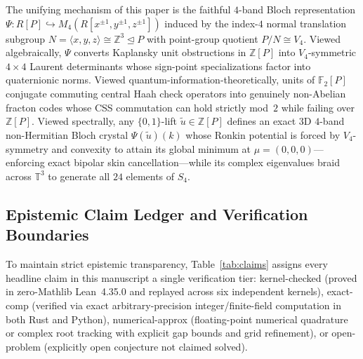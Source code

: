 \documentclass[11pt,reqno]{amsart}
\theoremstyle{definition}
\newcommand{\Z}{\mathbb{Z}}
\newcommand{\F}{\mathbb{F}}
\newcommand{\T}{\mathbb{T}}
\newcommand{\tierK}{\textsf{\scriptsize\textcolor{accentgreen}{kernel-checked}}}
\newcommand{\tierE}{\textsf{\scriptsize\textcolor{accentblue}{exact-comp}}}
\newcommand{\tierN}{\textsf{\scriptsize\textcolor{accentorange}{numerical-approx}}}
\newcommand{\tierO}{\textsf{\scriptsize\textcolor{accentpurple}{open-problem}}}
\begin{document}
The unifying mechanism of this paper is the faithful $4$-band Bloch representation
$\Psi : R[P] \hookrightarrow M_4(R[x^{\pm 1}, y^{\pm 1}, z^{\pm 1}])$ induced by the index-$4$
normal translation subgroup $N = \langle x, y, z \rangle \cong \Z^3 \trianglelefteq P$ with
point-group quotient $P/N \cong V_4$. Viewed algebraically, $\Psi$ converts Kaplansky unit
obstructions in $\Z[P]$ into $V_4$-symmetric $4 \times 4$ Laurent determinants whose sign-point
specializations factor into quaternionic norms. Viewed quantum-information-theoretically, units
of $\F_2[P]$ conjugate commuting central Haah check operators into genuinely non-Abelian fracton
codes whose CSS commutation can hold strictly mod~$2$ while failing over $\Z[P]$. Viewed
spectrally, any $\{0,1\}$-lift $\widetilde{u} \in \Z[P]$ defines an exact $3$D $4$-band
non-Hermitian Bloch crystal $\Psi(\widetilde{u})(k)$ whose Ronkin potential is forced by
$V_4$-symmetry and convexity to attain its global minimum at $\mu = (0,0,0)$---enforcing exact
bipolar skin cancellation---while its complex eigenvalues braid across $\T^3$ to generate all
$24$ elements of $S_4$.

\subsection{Epistemic Claim Ledger and Verification Boundaries}
\label{sec:claims}

To maintain strict epistemic transparency, Table~\ref{tab:claims} assigns every headline claim in
this manuscript a single verification tier:
\tierK{} (proved in zero-Mathlib Lean~4.35.0 and replayed across six independent kernels),
\tierE{} (verified via exact arbitrary-precision integer/finite-field computation in both Rust
and Python), \tierN{} (floating-point numerical quadrature or complex root tracking with explicit
gap bounds and grid refinement), or \tierO{} (explicitly open conjecture not claimed solved).
\end{document}
